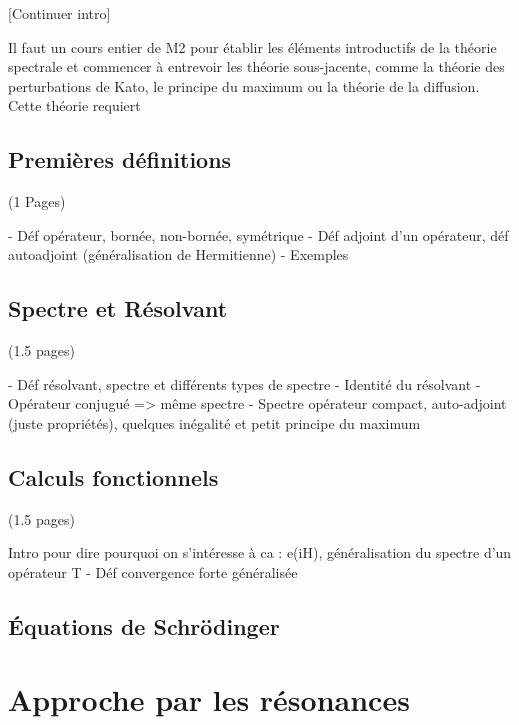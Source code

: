 \documentclass[12pt,openany,a4paper, titlepage]{article}
\theoremstyle{definition}
\theoremstyle{definition}
\theoremstyle{definition}
\theoremstyle{definition}
\theoremstyle{definition}
\theoremstyle{definition}
\begin{document}
[Continuer intro]

Il faut un cours entier de M2 pour établir les éléments introductifs de la théorie spectrale et commencer à entrevoir les théorie sous-jacente, comme la théorie des perturbations de Kato, le principe du maximum ou la théorie de la diffusion. Cette théorie requiert 

\subsection{Premières définitions} (1 Pages)

- Déf opérateur, bornée, non-bornée, symétrique
- Déf adjoint d'un opérateur, déf autoadjoint (généralisation de Hermitienne)
- Exemples

\subsection{Spectre et Résolvant} (1.5 pages)

- Déf résolvant, spectre et différents types de spectre
- Identité du résolvant
- Opérateur conjugué => même spectre
- Spectre opérateur compact, auto-adjoint (juste propriétés), quelques inégalité et petit principe du maximum


\subsection{Calculs fonctionnels} (1.5 pages)

Intro pour dire pourquoi on s'intéresse à ca : e(iH), généralisation du spectre d'un opérateur T
- Déf convergence forte généralisée

\subsection{Équations de Schrödinger}



\newpage
\section{Approche par les résonances}
\end{document}
